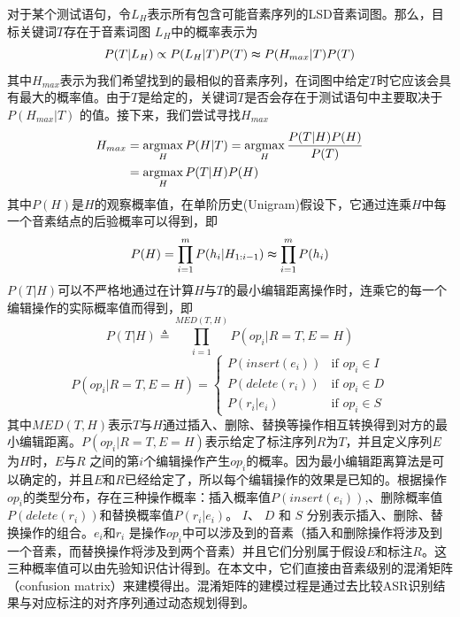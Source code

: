 对于某个测试语句，令$L_{H}$表示所有包含可能音素序列的LSD音素词图。那么，目标关键词$T$存在于音素词图 $L_{H}$中的概率表示为
\begin{equation}
P(T|L_{H}) \propto P(L_{H}|T)P(T) \thickapprox P(H_{max}|T)P(T)
\end{equation}
其中$H_{max}$表示为我们希望找到的最相似的音素序列，在词图中给定$T$时它应该会具有最大的概率值。由于$T$是给定的，关键词$T$是否会存在于测试语句中主要取决于$P(H_{max}|T)$ 的值。接下来，我们尝试寻找$H_{max}$
\begin{equation}
\label{equ:hlatt}
\begin{split}
H_{max} &= \mathop{\operatorname*{argmax}}_{H}{P(H|T)}=\mathop{\operatorname*{argmax}}_{H}{\frac{P(T|H)P(H)}{P(T)}} \\ &= \mathop{\operatorname*{argmax}}_{H}{P(T|H)P(H)}
\end{split}
\end{equation}
其中$P(H)$是$H$的观察概率值，在单阶历史(Unigram)假设下，它通过连乘$H$中每一个音素结点的后验概率可以得到，即
\begin{equation}
\label{equ:ph}
P(H) = \mathop{\prod}_{i=1}^{m}{P(h_{i}|H_{1:i-1})} \thickapprox \mathop{\prod}_{i=1}^{m}{P(h_{i})}
\end{equation}
$P(T|H)$可以不严格地通过在计算$H$与$T$的最小编辑距离操作时，连乘它的每一个编辑操作的实际概率值而得到，即
\begin{equation}
\label{equ:pth}
P(T|H) \triangleq \mathop{\prod}_{i=1}^{MED(T,H)}{P(op_{i}|R=T,E=H)}
\end{equation}
\begin{equation}
P(op_{i}|R=T,E=H) = \begin{cases}
  P(insert(e_{i})) & \text{if } op_{i} \in I \\
  P(delete(r_{i})) & \text{if } op_{i} \in D \\
  P(r_{i}|e_{i}) & \text{if } op_{i} \in S
\end{cases}
\end{equation}
其中$MED(T,H)$表示$T$与$H$通过插入、删除、替换等操作相互转换得到对方的最小编辑距离。$P(op_{i}|R=T,E=H)$表示给定了标注序列$R$为$T$，并且定义序列$E$为$H$时，$E$与$R$ 之间的第$i$个编辑操作产生$op_{i}$的概率。因为最小编辑距离算法是可以确定的，并且$E$和$R$已经给定了，所以每个编辑操作的效果是已知的。根据操作$op_{i}$的类型分布，存在三种操作概率：插入概率值$P(insert(e_{i}))$,、删除概率值$P(delete(r_{i}))$和替换概率值$P(r_{i}|e_{i})$。 $I$、 $D$ 和 $S$ 分别表示插入、删除、替换操作的组合。$e_{i}$和$r_{i}$ 是操作$op_{i}$中可以涉及到的音素（插入和删除操作将涉及到一个音素，而替换操作将涉及到两个音素）并且它们分别属于假设$E$和标注$R$。这三种概率值可以由先验知识估计得到。在本文中，它们直接由音素级别的混淆矩阵（confusion matrix）来建模得出。混淆矩阵的建模过程是通过去比较ASR识别结果与对应标注的对齐序列通过动态规划得到。
